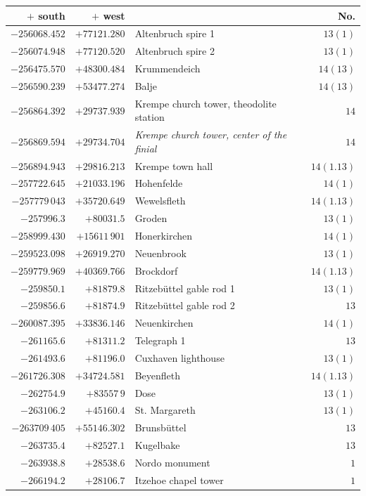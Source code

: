 \clearpage{}%
\begin{center}\begingroup\fontsize{8}{9}\selectfont
\setlength{\tabcolsep}{4pt}
\begin{tabular}{r|r|p{170pt}|r}\hline
\(+\) south&\(+\) west&&No.\\\hline
\(-256068.452\)&\(+77121.280\)&Altenbruch spire 1&\(13(1)\)\\
\(-256074.948\)&\(+77120.520\)&Altenbruch spire 2&\(13(1)\)\\
\(-256475.570\)&\(+48300.484\)&Krummendeich&\(14(13)\)\\
\(-256590.239\)&\(+53477.274\)&Balje&\(14(13)\)\\
\(-256864.392\)&\(+29737.939\)&Krempe church tower, theodolite station&\(14\)\\
\(-256869.594\)&\(+29734.704\)&\textit{Krempe church tower, center of the finial}&\(14\)\\
\(-256894.943\)&\(+29816.213\)&Krempe town hall&\(14(1.13)\)\\
\(-257722.645\)&\(+21033.196\)&Hohenfelde&\(14(1)\)\\
\(-257779\,043\)&\(+35720.649\)&Wewelsfleth&\(14(1.13)\)\\
\(-257996.3\)&\(+80031.5\)&Groden&\(13(1)\)\\
\(-258999.430\)&\(+15611\,901\)&Honerkirchen&\(14(1)\)\\
\(-259523.098\)&\(+26919.270\)&Neuenbrook&\(13(1)\)\\
\(-259779.969\)&\(+40369.766\)&Brockdorf&\(14(1.13)\)\\
\(-259850.1\)&\(+81879.8\)&Ritzebüttel gable rod 1&\(13(1)\)\\
\(-259856.6\)&\(+81874.9\)&Ritzebüttel gable rod 2&\(13\)\\
\(-260087.395\)&\(+33836.146\)&Neuenkirchen&\(14(1)\)\\
\(-261165.6\)&\(+81311.2\)&Telegraph 1&\(13\)\\
\(-261493.6\)&\(+81196.0\)&Cuxhaven lighthouse&\(13(1)\)\\
\(-261726.308\)&\(+34724.581\)&Beyenfleth&\(14(1.13)\)\\
\(-262754.9\)&\(+83557\,9\)&Dose&\(13(1)\)\\
\(-263106.2\)&\(+45160.4\)&St. Margareth&\(13(1)\)\\
\(-263709\,405\)&\(+55146.302\)&Brunsbüttel&\(13\)\\
\(-263735.4\)&\(+82527.1\)&Kugelbake&\(13\)\\
\(-263938.8\)&\(+28538.6\)&Nordo monument&\(1\)\\
\(-266194.2\)&\(+28106.7\)&Itzehoe chapel tower&\(1\)\\
\hline\end{tabular}\endgroup\end{center}
